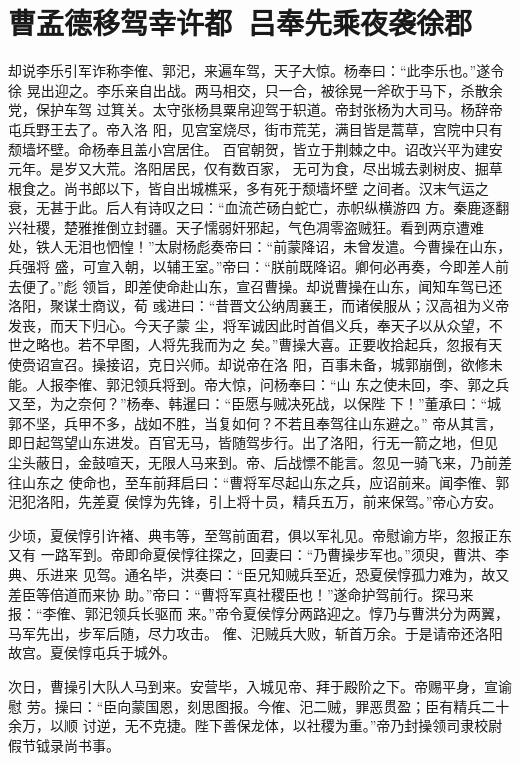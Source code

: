 \chapter{曹孟德移驾幸许都~吕奉先乘夜袭徐郡}

却说李乐引军诈称李傕、郭汜，来遍车驾，天子大惊。杨奉曰：“此李乐也。”遂令徐
晃出迎之。李乐亲自出战。两马相交，只一合，被徐晃一斧砍于马下，杀散余党，保护车驾
过箕关。太守张杨具粟帛迎驾于轵道。帝封张杨为大司马。杨辞帝屯兵野王去了。帝入洛
阳，见宫室烧尽，街市荒芜，满目皆是蒿草，宫院中只有颓墙坏壁。命杨奉且盖小宫居住。
百官朝贺，皆立于荆棘之中。诏改兴平为建安元年。是岁又大荒。洛阳居民，仅有数百家，
无可为食，尽出城去剥树皮、掘草根食之。尚书郎以下，皆自出城樵采，多有死于颓墙坏壁
之间者。汉末气运之衰，无甚于此。后人有诗叹之曰：“血流芒砀白蛇亡，赤帜纵横游四
方。秦鹿逐翻兴社稷，楚雅推倒立封疆。天子懦弱奸邪起，气色凋零盗贼狂。看到两京遭难
处，铁人无泪也怬惶！”太尉杨彪奏帝曰：“前蒙降诏，未曾发遣。今曹操在山东，兵强将
盛，可宣入朝，以辅王室。”帝曰：“朕前既降诏。卿何必再奏，今即差人前去便了。”彪
领旨，即差使命赴山东，宣召曹操。却说曹操在山东，闻知车驾已还洛阳，聚谋士商议，荀
彧进曰：“昔晋文公纳周襄王，而诸侯服从；汉高祖为义帝发丧，而天下归心。今天子蒙
尘，将军诚因此时首倡义兵，奉天子以从众望，不世之略也。若不早图，人将先我而为之
矣。”曹操大喜。正要收拾起兵，忽报有天使赍诏宣召。操接诏，克日兴师。却说帝在洛
阳，百事未备，城郭崩倒，欲修未能。人报李傕、郭汜领兵将到。帝大惊，问杨奉曰：“山
东之使未回，李、郭之兵又至，为之奈何？”杨奉、韩暹曰：“臣愿与贼决死战，以保陛
下！”董承曰：“城郭不坚，兵甲不多，战如不胜，当复如何？不若且奉驾往山东避之。”
帝从其言，即日起驾望山东进发。百官无马，皆随驾步行。出了洛阳，行无一箭之地，但见
尘头蔽日，金鼓喧天，无限人马来到。帝、后战慓不能言。忽见一骑飞来，乃前差往山东之
使命也，至车前拜启曰：“曹将军尽起山东之兵，应诏前来。闻李傕、郭汜犯洛阳，先差夏
侯惇为先锋，引上将十员，精兵五万，前来保驾。”帝心方安。

少顷，夏侯惇引许褚、典韦等，至驾前面君，俱以军礼见。帝慰谕方毕，忽报正东又有
一路军到。帝即命夏侯惇往探之，回妻曰：“乃曹操步军也。”须臾，曹洪、李典、乐进来
见驾。通名毕，洪奏曰：“臣兄知贼兵至近，恐夏侯惇孤力难为，故又差臣等倍道而来协
助。”帝曰：“曹将军真社稷臣也！”遂命护驾前行。探马来报：“李傕、郭汜领兵长驱而
来。”帝令夏侯惇分两路迎之。惇乃与曹洪分为两翼，马军先出，步军后随，尽力攻击。
傕、汜贼兵大败，斩首万余。于是请帝还洛阳故宫。夏侯惇屯兵于城外。

次日，曹操引大队人马到来。安营毕，入城见帝、拜于殿阶之下。帝赐平身，宣谕慰
劳。操曰：“臣向蒙国恩，刻思图报。今傕、汜二贼，罪恶贯盈；臣有精兵二十余万，以顺
讨逆，无不克捷。陛下善保龙体，以社稷为重。”帝乃封操领司隶校尉假节钺录尚书事。

